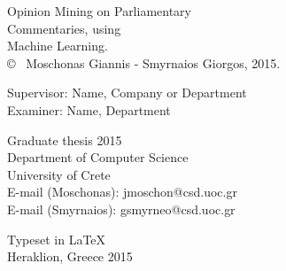 \newpage
\thispagestyle{plain}
\vspace*{4.5cm}
Opinion Mining on Parliamentary\\Commentaries, using\\Machine Learning.\\

\copyright ~  Moschonas Giannis - Smyrnaios Giorgos, 2015. \setlength{\parskip}{1cm}

Supervisor: Name, Company or Department\\
Examiner: Name, Department \setlength{\parskip}{1cm}

Graduate thesis 2015\\	%
Department of Computer Science\\
University of Crete\\
E-mail (Moschonas): jmoschon@csd.uoc.gr\\
E-mail (Smyrnaios): gsmyrneo@csd.uoc.gr\setlength{\parskip}{0.5cm}

\vfill

Typeset in \LaTeX \\
Heraklion, Greece 2015

